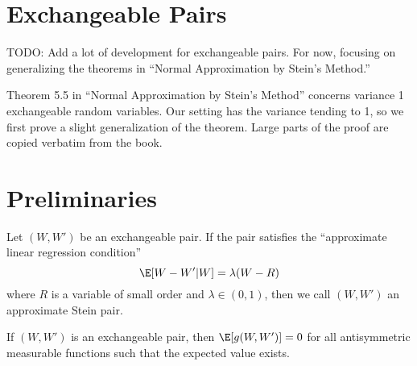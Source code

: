 \section{Exchangeable Pairs}
TODO: Add a lot of development for exchangeable pairs.  For now, focusing on generalizing the theorems
in ``Normal Approximation by Stein's Method.''

Theorem 5.5 in ``Normal Approximation by Stein's Method'' concerns variance 1 exchangeable
random variables.  Our setting has the variance tending to 1, so we first prove a slight
generalization of the theorem.  Large parts of the proof are copied verbatim from the book.

\section{Preliminaries}
\begin{definition}
  Let $(W, W')$ be an exchangeable pair.  If the pair satisfies the ``approximate linear
  regression condition''
  \begin{equation}
    \label{D:approx-stein-pair}
    \E [W - W' | W] = \lambda (W - R)
  \end{equation}
  where $R$ is a variable of small order and $\lambda \in (0, 1)$, then we call $(W, W')$ an
  approximate Stein pair.
\end{definition}

\begin{lemma}
  \label{L:antisymmetric}
  If $(W, W')$ is an exchangeable pair, then $\E [g(W, W')] = 0$ for all antisymmetric
  measurable functions such that the expected value exists.
\end{lemma}

